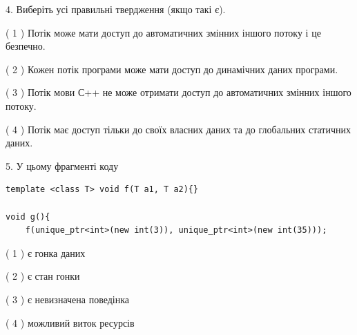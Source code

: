 \documentclass[12pt, ukrainian]{article}
\begin{document}
\begin {large}
{%
4. Виберіть усі правильні твердження (якщо такі є).\par
\vspace{2mm}

( 1 ) Потік може мати доступ до автоматичних змінних іншого потоку і це безпечно.%

( 2 ) Кожен потік програми може мати доступ до динамічних даних програми.%

( 3 ) Потік мови С++ не може отримати доступ до автоматичних змінних іншого потоку.%

( 4 ) Потік має доступ тільки до своїх власних даних та до глобальних статичних даних.%


5. У цьому фрагменті коду
\begin{verbatim}
template <class T> void f(T a1, T a2){}

void g(){
    f(unique_ptr<int>(new int(3)), unique_ptr<int>(new int(35)));
\end{verbatim}

( 1 ) є гонка даних%

( 2 ) є стан гонки%

( 3 ) є невизначена поведінка%

( 4 ) можливий виток ресурсів%
}
\end {large}
\end{document}
